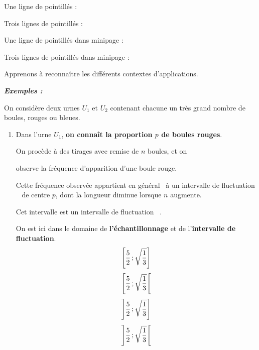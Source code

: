 \begin{spacing}{1.2}
Une ligne de pointillés :

\Pointilles

Trois lignes de pointillés :

\Pointilles[3]

\begin{minipage}{0.45\linewidth}

Une ligne de pointillés dans minipage :
\Pointilles

\end{minipage}
\hfill
\begin{minipage}{0.45\linewidth}

Trois lignes de pointillés dans minipage :
\Pointilles[3]

\end{minipage}

Apprenons à reconnaître les différents contextes d'applications.

\medskip


\textbf{\textit{Exemples :}}

On considère deux urnes $U_1$ et $U_2$ contenant chacune un très grand nombre de boules, rouges ou bleues.

\begin{enumerate}
\item Dans l'urne $U_1$, \textbf{on connaît la proportion $p$ de boules rouges}.

On procède à des tirages avec remise de $n$ boules, et on 

observe la fréquence d'apparition d'une boule rouge.

Cette fréquence observée appartient \og en général\fg~ à un \og intervalle de fluctuation \fg~ de centre $p$, dont la longueur diminue lorsque $n$ augmente.

Cet intervalle est un \og intervalle de fluctuation \fg~.

On est ici dans le domaine de \textbf{l'échantillonnage} et de l'\textbf{intervalle de fluctuation}.
\[\left[\dfrac{5}{2}\,;\sqrt{\dfrac{1}{3}}\right]\]
\[\left[\dfrac{5}{2}\,;\sqrt{\dfrac{1}{3}}\right[\]
\[\left]\dfrac{5}{2}\,;\sqrt{\dfrac{1}{3}}\right]\]
\[\left]\dfrac{5}{2}\,;\sqrt{\dfrac{1}{3}}\right[\]


\end{enumerate}
\end{spacing}
